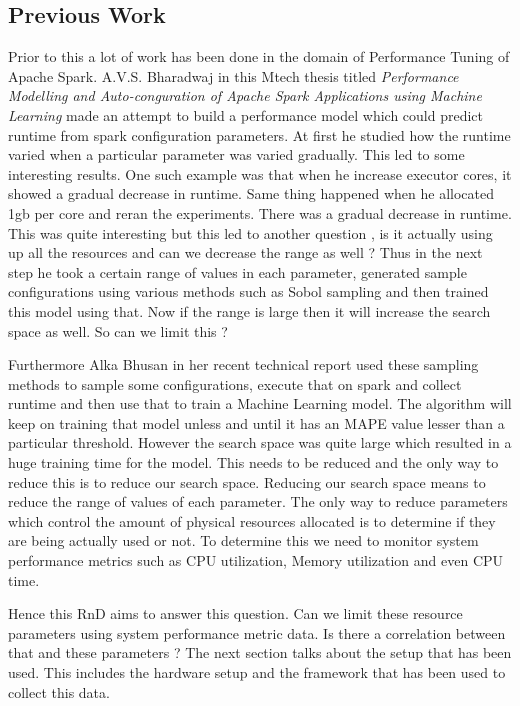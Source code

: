 \documentclass[11pt]{article}
\begin{document}
\subsection{Previous Work}
Prior to this a lot of work has been done in the domain of Performance Tuning of Apache Spark. A.V.S. Bharadwaj in this Mtech thesis titled \emph{Performance Modelling and Auto-conguration of Apache Spark Applications using Machine Learning} made an attempt to build a performance model which could predict runtime from spark configuration parameters. At first he studied how the runtime varied when a particular parameter was varied gradually. This led to some interesting results. One such example was that when he increase executor cores, it showed a gradual decrease in runtime. Same thing happened when he allocated 1gb per core and reran the experiments. There was a gradual decrease in runtime. This was quite interesting but this led to another question , is it actually using up all the resources and can we decrease the range as well ? Thus in the next step he took a certain range of values in each parameter, generated sample configurations using various methods such as Sobol sampling and then trained this model using that. Now if the range is large then it will increase the search space as well. So can we limit this ? 
\par Furthermore Alka Bhusan in her recent technical report used these sampling methods to sample some configurations, execute that on spark and collect runtime and then use that to train a Machine Learning model. The algorithm will keep on training that model unless and until it has an MAPE value lesser than a particular threshold. However the search space was quite large which resulted in a huge training time for the model. This needs to be reduced and the only way to reduce this is to reduce our search space. Reducing our search space means to reduce the range of values of each parameter. The only way to reduce parameters which control the amount of physical resources allocated is to determine if they are being actually used or not. To determine this we need to monitor system performance metrics such as CPU utilization, Memory utilization and even CPU time. 
\par Hence this RnD aims to answer this question. Can we limit these resource parameters using system performance metric data. Is there a correlation between that and these parameters ? The next section talks about the setup that has been used. This includes the hardware setup and the framework that has been used to collect this data.
\end{document}
